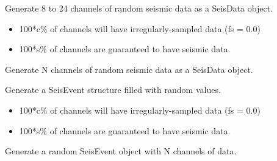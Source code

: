 \documentclass[letterpaper,11pt,english]{sphinxmanual}
\begin{document}
Generate 8 to 24 channels of random seismic data as a SeisData object.
\begin{itemize}
\item {} 
100*c\% of channels  will have irregularly-sampled data (fs = 0.0)

\item {} 
100*s\% of channels  are guaranteed to have seismic data.

\end{itemize}


\begin{fulllineitems}
\end{fulllineitems}


Generate N channels of random seismic data as a SeisData object.

\begin{fulllineitems}
\label{\detokenize{src/Submodules/randseis:randSeisEvent}}
\end{fulllineitems}


Generate a SeisEvent structure filled with random values.
\begin{itemize}
\item {} 
100*c\% of channels  will have irregularly-sampled data (fs = 0.0)

\item {} 
100*s\% of channels  are guaranteed to have seismic data.

\end{itemize}


\begin{fulllineitems}
\end{fulllineitems}


Generate a random SeisEvent object with N channels of data.

\begin{fulllineitems}
\label{\detokenize{src/Submodules/randseis:randSeisHdr}}
\end{fulllineitems}
\end{document}
